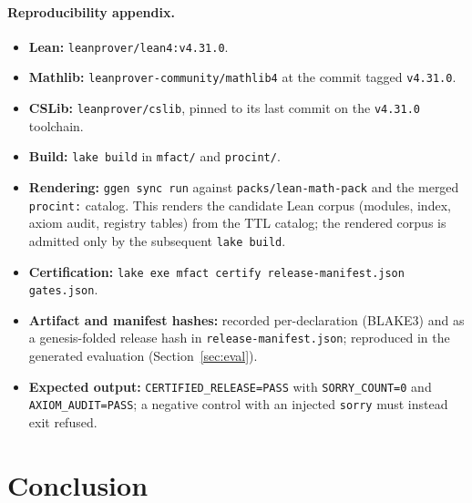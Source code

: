 \documentclass[11pt]{article}
\newif\ifreleasebuild
\begin{document}
\paragraph{Reproducibility appendix.}
\begin{itemize}
\item \textbf{Lean:} \texttt{leanprover/lean4:v4.31.0}.
\item \textbf{Mathlib:} \texttt{leanprover-community/mathlib4} at the commit
  tagged \texttt{v4.31.0}.
\item \textbf{CSLib:} \texttt{leanprover/cslib}, pinned to its last commit
  on the \texttt{v4.31.0} toolchain.
\item \textbf{Build:} \texttt{lake build} in \texttt{mfact/} and
  \texttt{procint/}.
\item \textbf{Rendering:} \texttt{ggen sync run} against
  \texttt{packs/lean-math-pack} and the merged \texttt{procint:} catalog.
  This renders the candidate Lean corpus (modules, index, axiom audit,
  registry tables) from the TTL catalog; the rendered corpus is admitted
  only by the subsequent \texttt{lake build}.
\item \textbf{Certification:} \texttt{lake exe mfact certify
  release-manifest.json gates.json}.
\item \textbf{Artifact and manifest hashes:} recorded per-declaration
  (BLAKE3) and as a genesis-folded release hash in
  \texttt{release-manifest.json}; reproduced in the generated evaluation
  (Section~\ref{sec:eval}).
\item \textbf{Expected output:} \texttt{CERTIFIED\_RELEASE=PASS} with
  \texttt{SORRY\_COUNT=0} and \texttt{AXIOM\_AUDIT=PASS}; a negative control
  with an injected \texttt{sorry} must instead exit refused.
\end{itemize}

\ifreleasebuild
  
\else
\fi

\ifreleasebuild
  
  
\else
\fi

\section{Conclusion}

\ifreleasebuild
  
\else
\fi



\end{document}
